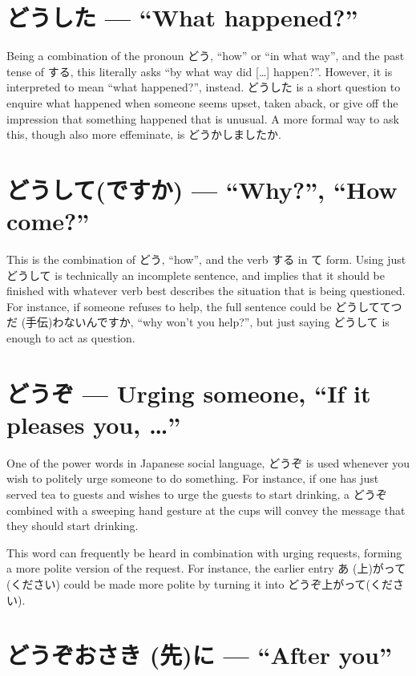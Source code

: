 \documentclass[11pt, b5paper, twoside, openright, onecolumn]{book}
\makeatletter
\newcommand*{\rubystack}[2]{{\relscale{0.5}%
  \begin{tabular}[b]{@{}c@{}}%
    {#1}\\%
   {\textscale{2}{#2}}%
  \end{tabular}}%
}
\DeclareRobustCommand*{\ruby}[2]{%
  \mbox{%
    \setlength{\parskip}{0ex}%
    \BeginAccSupp{method=pdfstringdef,ActualText={#1}}%
      \rubystack{\phantom{#2}}{#1}%
      \llap{%
        \rubystack{#2}{\phantom{#1}}%
      }%
    \EndAccSupp{}%
  }%
}
\renewcommand*{\ruby}[2]{#2 (#1)}%
\makeatother
\begin{document}
\section*{どうした — “What happened?”}

Being a combination of the pronoun どう‚ “how” or “in what way”‚ and the past tense of する‚ this literally asks “by what way did […] happen?”. However‚ it is interpreted to mean “what happened?”‚ instead. どうした is a short question to enquire what happened when someone seems upset‚ taken aback‚ or give off the impression that something happened that is unusual. A more formal way to ask this‚ though also more effeminate‚ is どうかしましたか.

\section*{どうして(ですか) — “Why?”‚ “How come?”}

This is the combination of どう‚ “how”‚ and the verb する in て form. Using just どうして is technically an incomplete sentence‚ and implies that it should be finished with whatever verb best describes the situation that is being questioned. For instance‚ if someone refuses to help‚ the full sentence could be どうして\ruby{手伝}{てつだ}わないんですか‚ “why won’t you help?”‚ but just saying どうして is enough to act as question.

\section*{どうぞ — Urging someone‚ “If it pleases you‚ …”}

One of the power words in Japanese social language‚ どうぞ is used whenever you wish to politely urge someone to do something. For instance‚ if one has just served tea to guests and wishes to urge the guests to start drinking‚ a どうぞ combined with a sweeping hand gesture at the cups will convey the message that they should start drinking.

This word can frequently be heard in combination with urging requests‚ forming a more polite version of the request. For instance‚ the earlier entry \ruby{上}{あ}がって(ください) could be made more polite by turning it into どうぞ上がって(ください).

\section*{どうぞお\ruby{先}{さき}に — “After you”}
\end{document}
